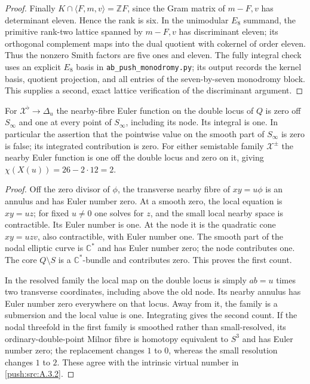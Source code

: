 \begin{proof}
Finally $K\cap\langle F,m,v\rangle=\mathbb ZF$, since
the Gram matrix of $m-F,v$ has determinant eleven.
Hence the rank is six. In the unimodular $E_8$ summand,
the primitive rank-two lattice spanned by $m-F,v$ has
discriminant eleven; its orthogonal complement maps into
the dual quotient with cokernel of order eleven. Thus the
nonzero Smith factors are five ones and eleven. The fully
integral check uses an explicit $E_8$ basis in
\texttt{ab\_push\_monodromy.py}; its output records the
kernel basis, quotient projection, and all entries of the
seven-by-seven monodromy block. This supplies a second,
exact lattice verification of the discriminant argument.
\end{proof}

\begin{proposition}\label{push:src:A.4.3}\label{push:A43}
For $\mathcal X^\flat\to\Delta_u$ the nearby-fibre Euler
function on the double locus of $Q$ is zero off $S_\infty$
and one at every point of $S_\infty$, including its node.
Its integral is one. In particular the assertion that the
pointwise value on the smooth part of $S_\infty$ is zero
is false; its integrated contribution is zero.
For either semistable family $\mathcal X^\pm$ the nearby
Euler function is one off the double locus and zero on
it, giving $\chi(X(u))=26-2\cdot12=2$.
\end{proposition}

\begin{proof}
Off the zero divisor of $\phi$, the transverse nearby
fibre of $xy=u\phi$ is an annulus and has Euler number
zero. At a smooth zero, the local equation is $xy=uz$;
for fixed $u\ne0$ one solves for $z$, and the small
local nearby space is contractible. Its Euler number
is one. At the node it is the quadratic cone
$xy=uzv$, also contractible, with Euler number one.
The smooth part of the nodal elliptic curve is
$\mathbb C^*$ and has Euler number zero; the node
contributes one. The core $Q\setminus S$ is a
$\mathbb C^*$-bundle and contributes zero.
This proves the first count.

In the resolved family the local map on the double locus
is simply $ab=u$ times two transverse coordinates,
including above the old node. Its nearby annulus has
Euler number zero everywhere on that locus. Away from
it, the family is a submersion and the local value is
one. Integrating gives the second count. If the nodal
threefold in the first family is smoothed rather than
small-resolved, its ordinary-double-point Milnor fibre
is homotopy equivalent to $S^3$ and has Euler number
zero; the replacement changes $1$ to $0$, whereas
the small resolution changes $1$ to $2$. These agree
with the intrinsic virtual number in \ref{push:src:A.3.2}.
\end{proof}


